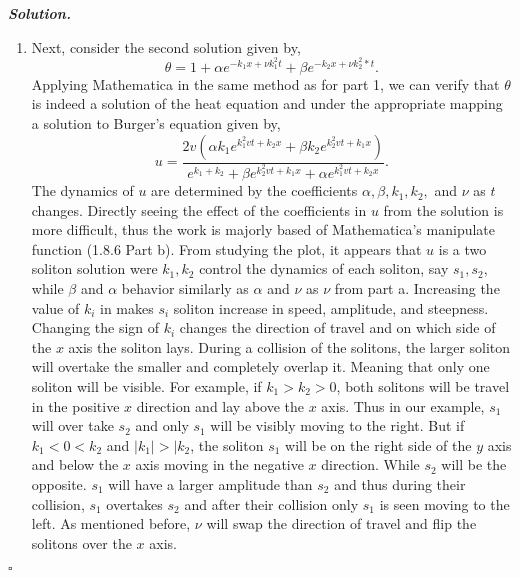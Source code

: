 \documentclass[12pt]{report}
\newenvironment{solution}[1][\it{Solution}]{\textbf{#1. } }{$\square$}
\begin{document}
\begin{solution}
\begin{enumerate}
        \item Next, consider the second solution given by, $$ \theta = 1 + \alpha e^{-k_1x+\nu k_1^2 t} + \beta e^{-k_2x + \nu k_2^2*t}.$$
        Applying Mathematica in the same method as for part 1, we can verify that $\theta$ is indeed a solution of the heat equation and under the appropriate mapping a solution to Burger's equation given by, $$u = \frac{2v\left(\alpha k_1 e^{k_1^2vt + k_2x} + \beta k_2 e^{k_2^2vt + k_1x}\right)}{e^{k_1+k_2} + \beta e^{k_2^2vt + k_1 x} + \alpha e^{k_1^2vt + k_2x}}.$$
        The dynamics of $u$ are determined by the coefficients $\alpha, \beta, k_1, k_2,$ and  $\nu$ as $t$ changes.
        Directly seeing the effect of the coefficients in $u$ from the solution is more difficult, thus the work is majorly based of Mathematica's manipulate function (1.8.6 Part b).
        From studying the plot, it appears that $u$ is a two soliton solution were $k_1,k_2$ control the dynamics of each soliton, say $s_1,s_2$, while $\beta$ and $\alpha$ behavior similarly as $\alpha$ and $\nu$ as $\nu$ from part a.
        Increasing the value of $k_i$ in makes $s_i$ soliton increase in speed, amplitude, and steepness.
        Changing the sign of $k_i$ changes the direction of travel and on which side of the $x$ axis the soliton lays.
        During a collision of the solitons, the larger soliton will overtake the smaller and completely overlap it. Meaning that only one soliton will be visible.
        For example, if $k_1 > k_2 > 0$, both solitons will be travel in the positive $x$ direction and lay above the $x$ axis.
        Thus in our example, $s_1$ will over take $s_2$ and only $s_1$ will be visibly moving to the right.
        But if $k_1 < 0 < k_2$ and $|k_1| > |k_2$, the soliton $s_1$ will be on the right side of the $y$ axis and below the $x$ axis moving in the negative $x$ direction. While $s_2$ will be the opposite. $s_1$ will have a larger amplitude than $s_2$ and thus during their collision, $s_1$ overtakes $s_2$ and after their collision only $s_1$ is seen moving to the left.
        As mentioned before, $\nu$ will swap the direction of travel and flip the solitons over the $x$ axis. 
    \end{enumerate}
\end{solution}

\end{document}

